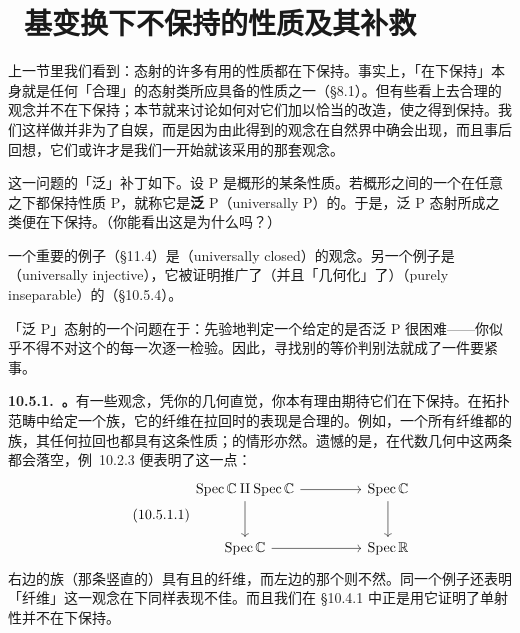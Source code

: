 
\section{\hard\ 基变换下不保持的性质及其补救}

上一节里我们看到：态射的许多有用的性质都在\trBaseChange{}下保持。事实上，「在\trBaseChange{}下保持」本身就是任何「合理」的态射类所应具备的性质之一（\S8.1）。但有些看上去合理的观念并不在\trBaseChange{}下保持；本节就来讨论如何对它们加以恰当的改造，使之得到保持。我们这样做并非为了自娱，而是因为由此得到的观念在自然界中确会出现，而且事后回想，它们或许才是我们一开始就该采用的那套观念。

这一问题的「泛」补丁如下。设 $\mathrm{P}$ 是概形的某条性质。若概形之间的一个\trMorphism{}在任意\trBaseChange{}之下都保持性质 $\mathrm{P}$，就称它是\textbf{泛} $\mathrm{P}$（universally $\mathrm{P}$）的。于是，泛 $\mathrm{P}$ 态射所成之类便在\trBaseChange{}下保持。（你能看出这是为什么吗？）

一个重要的例子（\S11.4）是\textbf{\trUniversallyClosed{}}（universally closed）\trMorphism{}的观念。另一个例子是\textbf{\trUniversallyInjective{}}（universally injective）\trMorphism，它被证明推广了（并且「几何化」了）\trPurelyInseparable{}（purely inseparable）的\trFieldExtension（\S10.5.4）。

「泛 $\mathrm{P}$」态射的一个问题在于：先验地判定一个给定的\trMorphism{}是否泛 $\mathrm{P}$ 很困难——你似乎不得不对这个\trMorphism{}的每一次\trBaseChange{}逐一检验。因此，寻找别的等价判别法就成了一件要紧事。

\textbf{10.5.1.\ \trGeometricFiber{}。}\quad 有一些观念，凭你的几何直觉，你本有理由期待它们在\trPullback{}下保持。在拓扑范畴中给定一个族，它的纤维在拉回时的表现是合理的。例如，一个所有纤维都\trIrreducible{}的族，其任何拉回也都具有这条性质；\trConnected{}的情形亦然。遗憾的是，在代数几何中这两条都会落空，例~10.2.3 便表明了这一点：
\begin{equation*}\tag{10.5.1.1}\label{eq:geometric-fibers-pullback-square}
\begin{tikzcd}[row sep=2.6em, column sep=4.4em]
\Spec\mathbb{C}\amalg\Spec\mathbb{C} \ar[r] \ar[d] & \Spec\mathbb{C} \ar[d] \\
\Spec\mathbb{C} \ar[r] & \Spec\mathbb{R}
\end{tikzcd}
\end{equation*}
右边的族（那条竖直的\trMap）具有\trIrreducible{}且\trConnected{}的纤维，而左边的那个则不然。同一个例子还表明「\trIntegral{}纤维」这一观念在\trPullback{}下同样表现不佳。而且我们在 \S10.4.1 中正是用它证明了单射性并不在\trBaseChange{}下保持。

